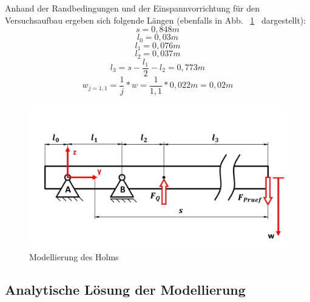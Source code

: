 \noindent Anhand der Randbedingungen und der Einspannvorrichtung für den Versuchsaufbau ergeben sich folgende Längen (ebenfalls in Abb. ~\ref{fig:Holmmodellierung}~ dargestellt): 
\begin{equation}
	s = 0,848 m
\end{equation}
\begin{equation}
	l_{0} = 0,03 m
\end{equation}
\begin{equation}
	l_{1} = 0,076 m
\end{equation}
\begin{equation}
	l_{2} = 0,037 m 
\end{equation}
\begin{equation}
	l_{3} = s - \frac{l_{1}}{2} - l_{2} = 0,773 m
\end{equation}
\begin{equation}
	w_{j=1,1} = \frac{1}{j} * w = \frac{1}{1,1} * 0,022 m = 0,02 m
\end{equation}
\begin{figure}
	\includegraphics[width=1.0\textwidth]{Bilder/Balkenmodell.jpg}
	\caption{Modellierung des Holms}
	\label{fig:Holmmodellierung}
\end{figure}

\subsection{Analytische Lösung der Modellierung}



